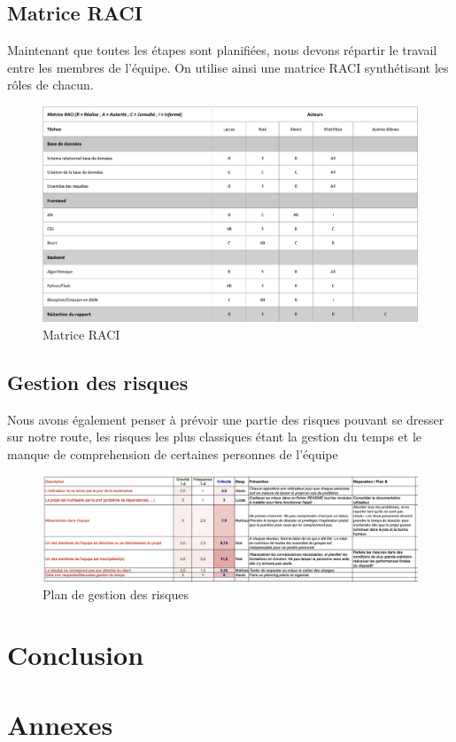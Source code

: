 \documentclass[french,a4paper]{article}
\begin{document}
\subsection{Matrice RACI}
Maintenant que toutes les étapes sont planifiées, nous devons répartir le travail entre les membres de l’équipe. On utilise ainsi une matrice RACI synthétisant les rôles de chacun.

\begin{figure}[H]
    \centering
    \includegraphics[width=1\textwidth]{img/RACI.png}
    \caption{Matrice RACI}
\end{figure} 

\subsection{Gestion des risques}
Nous avons également penser à prévoir une partie des risques pouvant se dresser sur notre route, les risques les plus classiques étant 
la gestion du temps et le manque de comprehension de certaines personnes de l'équipe
\begin{figure}[H]
    \centering
    \includegraphics[width=1\textwidth]{img/Plan_gestion_risque.png}
    \caption{Plan de gestion des risques}
\end{figure} 

\section{Conclusion}

\section{Annexes}






\end{document}
